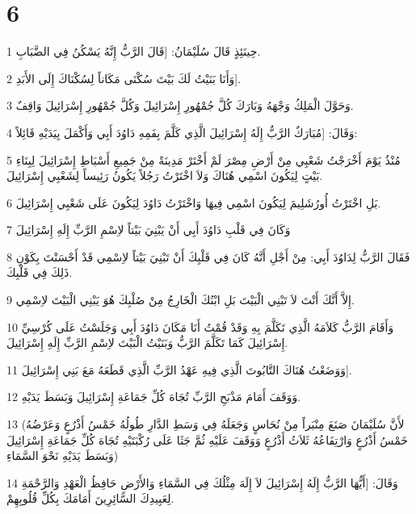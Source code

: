 \chapter{6}

\par 1 حِينَئِذٍ قَالَ سُلَيْمَانُ: [قَالَ الرَّبُّ إِنَّهُ يَسْكُنُ فِي الضَّبَابِ.
\par 2 وَأَنَا بَنَيْتُ لَكَ بَيْتَ سُكْنَى مَكَاناً لِسُكْنَاكَ إِلَى الأَبَدِ].
\par 3 وَحَوَّلَ الْمَلِكُ وَجْهَهُ وَبَارَكَ كُلَّ جُمْهُورِ إِسْرَائِيلَ وَكُلَّ جُمْهُورِ إِسْرَائِيلَ وَاقِفٌ.
\par 4 وَقَالَ: [مُبَارَكٌ الرَّبُّ إِلَهُ إِسْرَائِيلَ الَّذِي كَلَّمَ بِفَمِهِ دَاوُدَ أَبِي وَأَكْمَلَ بِيَدَيْهِ قَائِلاً:
\par 5 مُنْذُ يَوْمَ أَخْرَجْتُ شَعْبِي مِنْ أَرْضِ مِصْرَ لَمْ أَخْتَرْ مَدِينَةً مِنْ جَمِيعِ أَسْبَاطِ إِسْرَائِيلَ لِبِنَاءِ بَيْتٍ لِيَكُونَ اسْمِي هُنَاكَ وَلاَ اخْتَرْتُ رَجُلاً يَكُونُ رَئِيساً لِشَعْبِي إِسْرَائِيلَ.
\par 6 بَلِ اخْتَرْتُ أُورُشَلِيمَ لِيَكُونَ اسْمِي فِيهَا وَاخْتَرْتُ دَاوُدَ لِيَكُونَ عَلَى شَعْبِي إِسْرَائِيلَ.
\par 7 وَكَانَ فِي قَلْبِ دَاوُدَ أَبِي أَنْ يَبْنِيَ بَيْتاً لاِسْمِ الرَّبِّ إِلَهِ إِسْرَائِيلَ
\par 8 فَقَالَ الرَّبُّ لِدَاوُدَ أَبِي: مِنْ أَجْلِ أَنَّهُ كَانَ فِي قَلْبِكَ أَنْ تَبْنِيَ بَيْتاً لاِسْمِي قَدْ أَحْسَنْتَ بِكَوْنِ ذَلِكَ فِي قَلْبِكَ.
\par 9 إِلاَّ أَنَّكَ أَنْتَ لاَ تَبْنِي الْبَيْتَ بَلِ ابْنُكَ الْخَارِجُ مِنْ صُلْبِكَ هُوَ يَبْنِي الْبَيْتَ لاِسْمِي.
\par 10 وَأَقَامَ الرَّبُّ كَلاَمَهُ الَّذِي تَكَلَّمَ بِهِ وَقَدْ قُمْتُ أَنَا مَكَانَ دَاوُدَ أَبِي وَجَلَسْتُ عَلَى كُرْسِيِّ إِسْرَائِيلَ كَمَا تَكَلَّمَ الرَّبُّ وَبَنَيْتُ الْبَيْتَ لاِسْمِ الرَّبِّ إِلَهِ إِسْرَائِيلَ.
\par 11 وَوَضَعْتُ هُنَاكَ التَّابُوتَ الَّذِي فِيهِ عَهْدُ الرَّبِّ الَّذِي قَطَعَهُ مَعَ بَنِي إِسْرَائِيلَ].
\par 12 وَوَقَفَ أَمَامَ مَذْبَحِ الرَّبِّ تُجَاهَ كُلِّ جَمَاعَةِ إِسْرَائِيلَ وَبَسَطَ يَدَيْهِ.
\par 13 (لأَنَّ سُلَيْمَانَ صَنَعَ مِنْبَراً مِنْ نُحَاسٍ وَجَعَلَهُ فِي وَسَطِ الدَّارِ طُولُهُ خَمْسُ أَذْرُعٍ وَعَرْضُهُ خَمْسُ أَذْرُعٍ وَارْتِفَاعُهُ ثَلاَثُ أَذْرُعٍ وَوَقَفَ عَلَيْهِ ثُمَّ جَثَا عَلَى رُكْبَتَيْهِ تُجَاهَ كُلِّ جَمَاعَةِ إِسْرَائِيلَ وَبَسَطَ يَدَيْهِ نَحْوَ السَّمَاءِ)
\par 14 وَقَالَ: [أَيُّهَا الرَّبُّ إِلَهُ إِسْرَائِيلَ لاَ إِلَهَ مِثْلُكَ فِي السَّمَاءِ وَالأَرْضِ حَافِظُ الْعَهْدِ وَالرَّحْمَةِ لِعَبِيدِكَ السَّائِرِينَ أَمَامَكَ بِكُلِّ قُلُوبِهِمْ.
